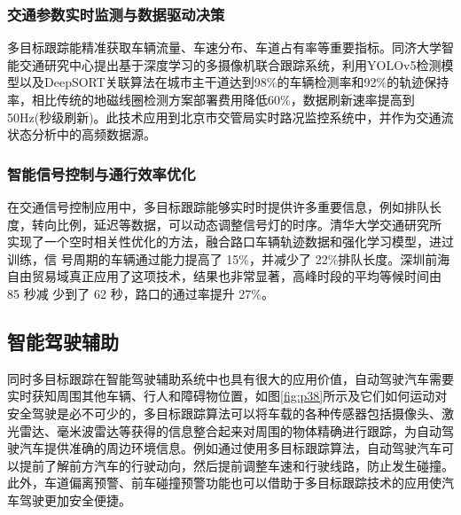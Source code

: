 \subsubsection{交通参数实时监测与数据驱动决策}

多目标跟踪能精准获取车辆流量、车速分布、车道占有率等重要指标。同济大学智能交通研究中心\cite{tongji2022visual}提出基于深度学习的多摄像机联合跟踪系统，利用YOLOv5检测模型以及DeepSORT关联算法在城市主干道达到98\%的车辆检测率和92\%的轨迹保持率，相比传统的地磁线圈检测方案部署费用降低60\%，数据刷新速率提高到50Hz(秒级刷新)。此技术应用到北京市交管局实时路况监控系统中，并作为交通流状态分析中的高频数据源。





\subsubsection{智能信号控制与通行效率优化}


在交通信号控制应用中，多目标跟踪能够实时时提供许多重要信息，例如排队长度，转向比例，延迟等数据，可以动态调整信号灯的时序。清华大学交通研究所 \cite{qinghua2021optimization} 实现了一个空时相关性优化的方法，融合路口车辆轨迹数据和强化学习模型，进过训练，信 号周期的车辆通过能力提高了 15\%，并减少了 22\%排队长度。深圳前海自由贸易域真正应用了这项技术，结果也非常显著，高峰时段的平均等候时间由 85 秒减 少到了 62 秒，路口的通过率提升 27\%。






\subsection{智能驾驶辅助}


同时多目标跟踪在智能驾驶辅助系统中也具有很大的应用价值，自动驾驶汽车需要实时获知周围其他车辆、行人和障碍物位置，如图\ref{fig:p38}所示及它们如何运动对安全驾驶是必不可少的，多目标跟踪算法可以将车载的各种传感器包括摄像头、激光雷达、毫米波雷达等获得的信息整合起来对周围的物体精确进行跟踪，为自动驾驶汽车提供准确的周边环境信息。例如通过使用多目标跟踪算法，自动驾驶汽车可以提前了解前方汽车的行驶动向，然后提前调整车速和行驶线路，防止发生碰撞。此外，车道偏离预警、前车碰撞预警功能也可以借助于多目标跟踪技术的应用使汽车驾驶更加安全便捷。




